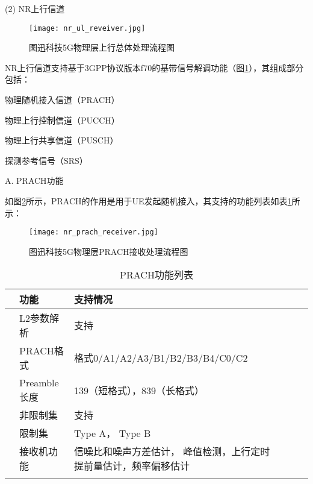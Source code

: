 (2) NR上行信道 

\begin{figure}[!htbp]
  \centering
  \texttt{[image: nr\_ul\_reveiver.jpg]}
  \caption{图迅科技5G物理层上行总体处理流程图}
  \label{F.1_7}
\end{figure}

\par
{} %
\setlength{\hangindent}{2em}
NR上行信道支持基于3GPP协议版本f70的基带信号解调功能（图\ref{F.1_7}），其组成部分包括：
\par
{} %
\setlength{\hangindent}{2em}
物理随机接入信道（PRACH）
\par
{} %
\setlength{\hangindent}{2em}
物理上行控制信道（PUCCH）
\par
{} %
\setlength{\hangindent}{2em}
物理上行共享信道（PUSCH）
\par
{} %
\setlength{\hangindent}{2em}
探测参考信号（SRS）

A.	PRACH功能

\par
{} %
\setlength{\hangindent}{2em}
如图\ref{F.1_8}所示，PRACH的作用是用于UE发起随机接入，其支持的功能列表如表\ref{T.1_6}所示：

\begin{figure}[H]
  \centering
  \texttt{[image: nr\_prach\_receiver.jpg]}
  \caption{图迅科技5G物理层PRACH接收处理流程图}
  \label{F.1_8}
\end{figure}

\begin{table}[htb]
    \centering
    \caption{PRACH功能列表}
    \label{T.1_6}
    \begin{tabular}{llllll}
        \hline
          & 功能   & 支持情况 \\
        \hline
          & L2参数解析 & 支持 \\
        \hline
          & PRACH格式 & 格式0/A1/A2/A3/B1/B2/B3/B4/C0/C2 \\
        \hline
          & Preamble长度 & 139（短格式），839（长格式）\\
        \hline
          & 非限制集 & 支持 \\
        \hline
          & 限制集 & Type A， Type B \\
        \hline
          & 接收机功能 & 信噪比和噪声方差估计， 峰值检测，上行定时提前量估计，频率偏移估计 \\
        \hline{}
    \end{tabular}
\end{table}

